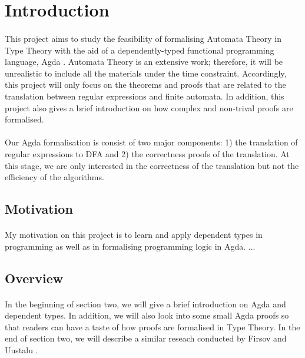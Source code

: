 \section{Introduction}
\paragraph{} This project aims to study the feasibility of formalising
Automata Theory \cite{aho1972} in Type Theory with the aid of a dependently-typed
functional programming language, Agda \cite{agdawiki2016}. Automata
Theory is an extensive work; therefore, it will be unrealistic to
include all the materials under the time constraint. Accordingly, this project will only focus on the theorems and
proofs that are related to the translation between regular expressions
and finite automata. In addition, this project also gives a brief introduction
on how complex and non-trival proofs are formalised. 

\paragraph{} Our Agda formalisation is consist of two major
components: 1) the translation of regular expressions to DFA and 2)
the correctness proofs of the translation. At this stage, we are only
interested in the correctness of the translation but not the
efficiency of the algorithms. 


\subsection{Motivation}
\paragraph{} My motivation on this project is to learn and apply
dependent types in programming as well as in formalising programming logic in
Agda. ... 


\subsection{Overview}
\paragraph{} In the beginning of section two, we will give a brief
introduction on Agda and dependent types. In addition, we will also look into some small Agda proofs so that readers can
have a taste of how proofs are formalised in Type Theory. In the end
of section two, we will describe a similar reseach
conducted by Firsov and Uustalu \cite{firsov2013}. 

